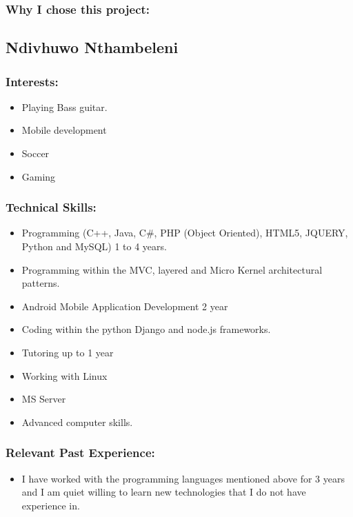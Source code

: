 \subsubsection{Why I chose this project:}

\newpage

\subsection{Ndivhuwo Nthambeleni}

\subsubsection{Interests:}
\begin{itemize}
		\item Playing Bass guitar.
		\item Mobile development
		\item Soccer
		\item Gaming
	\end{itemize}

\subsubsection{Technical Skills:}
\begin{itemize}
		\item Programming (C++, Java, C#, PHP (Object Oriented), HTML5, JQUERY, Python and MySQL) 1 to 4 years.
		\item Programming within the MVC, layered and Micro Kernel architectural patterns.
		\item Android Mobile Application Development 2 year
		\item Coding within the python Django and node.js frameworks.
		\item Tutoring up to 1 year
		\item Working with Linux 
		\item MS Server
		\item Advanced computer skills.
	\end{itemize}

\subsubsection{Relevant Past Experience:}
\begin{itemize}
		\item I have worked with the programming languages mentioned above for 3 years and I am quiet willing to learn new technologies that I do not have experience in.
\end{itemize}

